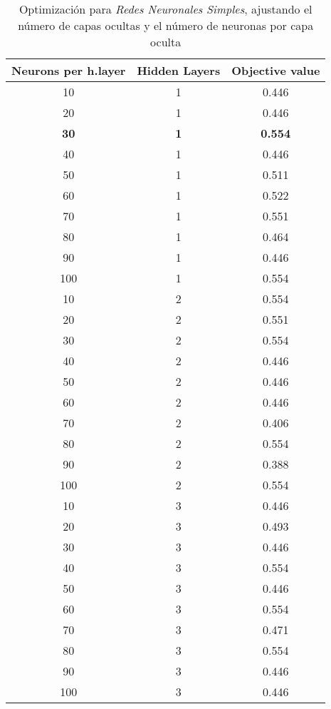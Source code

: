 \documentclass[11pt]{article}
\begin{document}
\begin{table}[H]
\begin{center}
    \begin{tabular}{|c|c|c|}
        \hline
        Neurons per h.layer&Hidden Layers&Objective value \\
        \hline
        10&1&0.446 \\
        20&1&0.446 \\
        \textbf{30}&\textbf{1}&\textbf{0.554} \\
        40&1&0.446 \\
        50&1&0.511 \\
        60&1&0.522 \\
        70&1&0.551 \\
        80&1&0.464 \\
        90&1&0.446 \\
        100&1&0.554 \\
        10&2&0.554 \\
        20&2&0.551 \\
        30&2&0.554 \\
        40&2&0.446 \\
        50&2&0.446 \\
        60&2&0.446 \\
        70&2&0.406 \\
        80&2&0.554 \\
        90&2&0.388 \\
        100&2&0.554 \\
        10&3&0.446 \\
        20&3&0.493 \\
        30&3&0.446 \\
        40&3&0.554 \\
        50&3&0.446 \\
        60&3&0.554 \\
        70&3&0.471 \\
        80&3&0.554 \\
        90&3&0.446 \\
        100&3&0.446 \\
        \hline

    \end{tabular}
\end{center}
    \caption{Optimización para \emph{Redes Neuronales Simples}, ajustando el número de capas ocultas y el número de neuronas por capa oculta}
\end{table}
\end{document}
